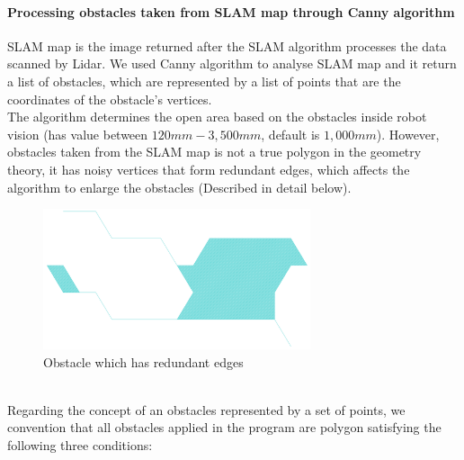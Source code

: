 \documentclass[13pt,a4paper]{article}
\begin{document}
			\paragraph{Processing obstacles taken from SLAM map through Canny algorithm\\}
			SLAM map is the image returned after the SLAM algorithm processes the data scanned by Lidar. We used Canny algorithm to analyse SLAM map and it return a list of obstacles, which are represented by a list of points that are the coordinates of the obstacle's vertices. \\
			The algorithm determines the open area based on the obstacles inside robot vision (has value between $120mm - 3,500mm$, default is $1,000mm$). However, obstacles taken from the SLAM map is not a true polygon in the geometry theory, it has noisy vertices that form redundant edges, which affects the algorithm to enlarge the obstacles (Described in detail below).
			\begin{figure}[!h]
				\centering
				\includegraphics[width=0.7\textwidth]{Robot_Global_Vision_Update/RGVU_original_obstacle.png}
				\caption{Obstacle which has redundant edges}
			\end{figure} \\
			Regarding the concept of an obstacles represented by a set of points, we convention that all obstacles applied in the program are polygon satisfying the following three conditions:
\end{document}
